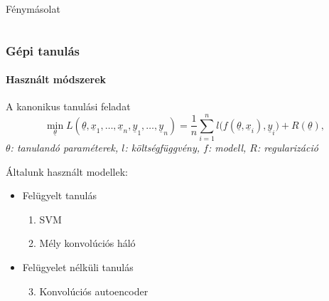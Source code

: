 \documentclass[11pt]{beamer}
\newcommand{\sumn}[1]{\sum\limits_{{#1}=1}^{n}}
\begin{document}
\begin{frame}
\begin{columns}[t]
\begin{column}{.5\textwidth}
			\centering
			Fénymásolat

		\end{column}				
	\end{columns}



%	
%		
%		
%		
%			
%			
%		

\end{frame}

\begin{frame}
	\frametitle{Gépi tanulás}
	\framesubtitle{Használt módszerek}
	
	
	\begin{block}{A kanonikus tanulási feladat}
			\[ 
		\min\limits_{\underline{\theta}} L(\underline{\theta}, \underline{x}_1, \dots, \underline{x}_n, \underline{y}_1, \dots, \underline{y}_n) = \frac{1}{n}  \sumn i l\big(f(\underline{\theta}, \underline{x}_i), \underline{y}_i\big) + R(\underline{\theta})
		, \]
	\textit{$ \theta $: tanulandó paraméterek, $ l $: költségfüggvény, $ f $: modell, $ R $: regularizáció}
	\end{block}


	
	Általunk használt modellek:
	\begin{itemize}
	\item 
		Felügyelt tanulás
		
		\begin{enumerate}
		\item 
			SVM	
		\item 
			Mély konvolúciós háló
		
		\end{enumerate}
		
	\item 
		Felügyelet nélküli tanulás
		
		\begin{enumerate}
		\setcounter{enumi}{2}
		\item 
			Konvolúciós autoencoder
		\end{enumerate}		
		
	\end{itemize}
\end{frame}
\end{document}
